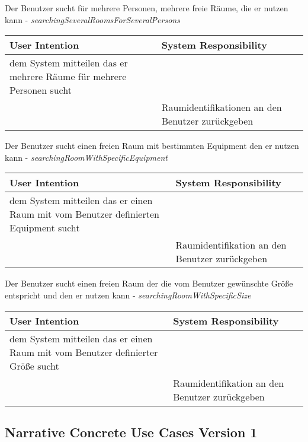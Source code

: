 \begin{table}[h]
	Der Benutzer sucht für mehrere Personen, mehrere freie Räume, die er nutzen kann - \textit{searchingSeveralRoomsForSeveralPersons}\\
	\begin{tabularx}{\textwidth}{|X|X|}
	\rowcolor{heading} \textbf{User Intention} & \textbf{System Responsibility}\\ \hline
	dem System mitteilen das er mehrere Räume für mehrere Personen sucht & \\
	 & Raumidentifikationen an den Benutzer zurückgeben \\ \hline
	\end{tabularx}
	
	Der Benutzer sucht einen freien Raum mit bestimmten Equipment den er nutzen kann - \textit{searchingRoomWithSpecificEquipment}\\
	\begin{tabularx}{\textwidth}{|X|X|}
	\rowcolor{heading} \textbf{User Intention} & \textbf{System Responsibility}\\ \hline
	dem System mitteilen das er einen Raum mit vom Benutzer definierten Equipment sucht & \\
	 & Raumidentifikation an den Benutzer zurückgeben \\ \hline
	\end{tabularx}
	
	Der Benutzer sucht einen freien Raum der die vom Benutzer gewünschte Größe entspricht und den er nutzen kann - \textit{searchingRoomWithSpecificSize}\\
	\begin{tabularx}{\textwidth}{|X|X|}
	\rowcolor{heading} \textbf{User Intention} & \textbf{System Responsibility}\\ \hline
	dem System mitteilen das er einen Raum mit vom Benutzer definierter Größe sucht & \\
	 & Raumidentifikation an den Benutzer zurückgeben \\ \hline
	\end{tabularx}
\end{table}
\clearpage

\subsection{Narrative Concrete Use Cases Version 1}
\label{anhang:Narrative_Concrete_Use_Cases_v1}

